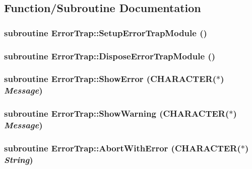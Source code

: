 \subsection{Function/Subroutine Documentation}
\hypertarget{namespace_error_trap_a611b4303bac6ac22cc75d77d1ddd7182}{
\subsubsection[{SetupErrorTrapModule}]{\setlength{\rightskip}{0pt plus 5cm}subroutine ErrorTrap::SetupErrorTrapModule ()}}
\label{namespace_error_trap_a611b4303bac6ac22cc75d77d1ddd7182}
\hypertarget{namespace_error_trap_a3f6ccae3b4a825f702ab38fd75114d67}{
\subsubsection[{DisposeErrorTrapModule}]{\setlength{\rightskip}{0pt plus 5cm}subroutine ErrorTrap::DisposeErrorTrapModule ()}}
\label{namespace_error_trap_a3f6ccae3b4a825f702ab38fd75114d67}
\hypertarget{namespace_error_trap_a692b52f918df54cd99082da25793d646}{
\subsubsection[{ShowError}]{\setlength{\rightskip}{0pt plus 5cm}subroutine ErrorTrap::ShowError (CHARACTER($\ast$) {\em Message})}}
\label{namespace_error_trap_a692b52f918df54cd99082da25793d646}
\hypertarget{namespace_error_trap_ace2fdc9fc500ac4dffaf0a06e053b6a0}{
\subsubsection[{ShowWarning}]{\setlength{\rightskip}{0pt plus 5cm}subroutine ErrorTrap::ShowWarning (CHARACTER($\ast$) {\em Message})}}
\label{namespace_error_trap_ace2fdc9fc500ac4dffaf0a06e053b6a0}
\hypertarget{namespace_error_trap_ae80447005fe2502fdd96646cd1510389}{
\subsubsection[{AbortWithError}]{\setlength{\rightskip}{0pt plus 5cm}subroutine ErrorTrap::AbortWithError (CHARACTER($\ast$) {\em String})}}
